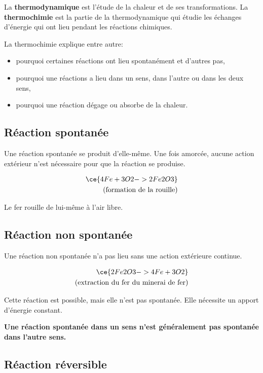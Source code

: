\documentclass[
  11pt,
  a4paper,
  openany]{book}
\providecommand{\tightlist}{%
  \setlength{\itemsep}{0pt}\setlength{\parskip}{0pt}}
\begin{document}
La \textbf{thermodynamique} est l'étude de la chaleur et de ses transformations. La \textbf{thermochimie} est la partie de la thermodynamique qui étudie les échanges d'énergie qui ont lieu pendant les réactions chimiques.

La thermochimie explique entre autre:

\begin{itemize}
\tightlist
\item
  pourquoi certaines réactions ont lieu spontanément et d'autres pas,
\item
  pourquoi une réactions a lieu dans un sens, dans l'autre ou dans les deux sens,
\item
  pourquoi une réaction dégage ou absorbe de la chaleur.
\end{itemize}

\subsection{Réaction spontanée}\label{ruxe9action-spontanuxe9e}

Une réaction spontanée se produit d'elle-même. Une fois amorcée, aucune action extérieur n'est nécessaire pour que la réaction se produise.

\[ \begin{split}
  \ce{ 4 Fe + 3O2 -> 2Fe2O3 } \\
  \text{(formation de la rouille)}
  \end{split} \]

Le fer rouille de lui-même à l'air libre.

\subsection{Réaction non spontanée}\label{ruxe9action-non-spontanuxe9e}

Une réaction non spontanée n'a pas lieu sans une action extérieure continue.

\[ \begin{split}
  \ce{ 2Fe2O3 -> 4 Fe + 3O2 } \\
  \text{(extraction du fer du minerai de fer)}
  \end{split} \]

Cette réaction est possible, mais elle n'est pas spontanée. Elle nécessite un apport d'énergie constant.

\textbf{Une réaction spontanée dans un sens n'est généralement pas spontanée dans l'autre sens.}

\subsection{Réaction réversible}\label{ruxe9action-ruxe9versible}
\end{document}
